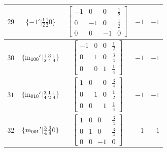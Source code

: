 \documentclass[fleqn,8pt]{jsarticle}
\begin{document}
\begin{longtable}{ccccc}
$ 29 $ & $ \{-1{}'|\frac{1}{2} \frac{1}{2} 0\} $ & $ \begin{bmatrix} -1 & 0 & 0 & \frac{1}{2} \\ 0 & -1 & 0 & \frac{1}{2} \\ 0 & 0 & -1 & 0 \end{bmatrix} $ & $ -1 $ & $ -1 $ \\ \hline
$ 30 $ & $ \{{\rm m}_{100}{}'|\frac{1}{2} \frac{3}{4} \frac{1}{4}\} $ & $ \begin{bmatrix} -1 & 0 & 0 & \frac{1}{2} \\ 0 & 1 & 0 & \frac{3}{4} \\ 0 & 0 & 1 & \frac{1}{4} \end{bmatrix} $ & $ -1 $ & $ -1 $ \\ \hline
$ 31 $ & $ \{{\rm m}_{010}{}'|\frac{3}{4} \frac{1}{2} \frac{1}{4}\} $ & $ \begin{bmatrix} 1 & 0 & 0 & \frac{3}{4} \\ 0 & -1 & 0 & \frac{1}{2} \\ 0 & 0 & 1 & \frac{1}{4} \end{bmatrix} $ & $ -1 $ & $ -1 $ \\ \hline
$ 32 $ & $ \{{\rm m}_{001}{}'|\frac{3}{4} \frac{3}{4} 0\} $ & $ \begin{bmatrix} 1 & 0 & 0 & \frac{3}{4} \\ 0 & 1 & 0 & \frac{3}{4} \\ 0 & 0 & -1 & 0 \end{bmatrix} $ & $ -1 $ & $ -1 $ \\
\end{longtable}
\end{document}
